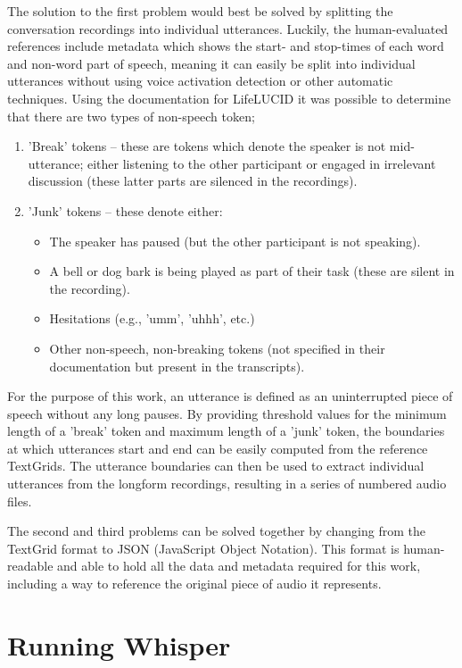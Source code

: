 The solution to the first problem would best be solved by splitting the conversation recordings into individual utterances.
Luckily, the human-evaluated references include metadata which shows the start- and stop-times of each word and non-word part of speech, meaning it can easily be split into individual utterances without using voice activation detection or other automatic techniques.
Using the documentation for LifeLUCID it was possible to determine that there are two types of non-speech token;

\begin{enumerate}
  \item 'Break' tokens -- these are tokens which denote the speaker is not mid-utterance; either listening to the other participant or engaged in irrelevant discussion (these latter parts are silenced in the recordings).
  \item 'Junk' tokens -- these denote either:
    \begin{itemize}
      \item The speaker has paused (but the other participant is not speaking).
      \item A bell or dog bark is being played as part of their task (these are silent in the recording).
      \item Hesitations (e.g., 'umm', 'uhhh', etc.)
      \item Other non-speech, non-breaking tokens (not specified in their documentation but present in the transcripts).
    \end{itemize}
\end{enumerate}

For the purpose of this work, an utterance is defined as an uninterrupted piece of speech without any long pauses.
By providing threshold values for the minimum length of a 'break' token and maximum length of a 'junk' token, the boundaries at which utterances start and end can be easily computed from the reference TextGrids.
The utterance boundaries can then be used to extract individual utterances from the longform recordings, resulting in a series of numbered audio files.

The second and third problems can be solved together by changing from the TextGrid format to JSON (JavaScript Object Notation).
This format is human-readable\cite{nurseitov2009comparison} and able to hold all the data and metadata required for this work, including a way to reference the original piece of audio it represents.

\section{Running Whisper}

